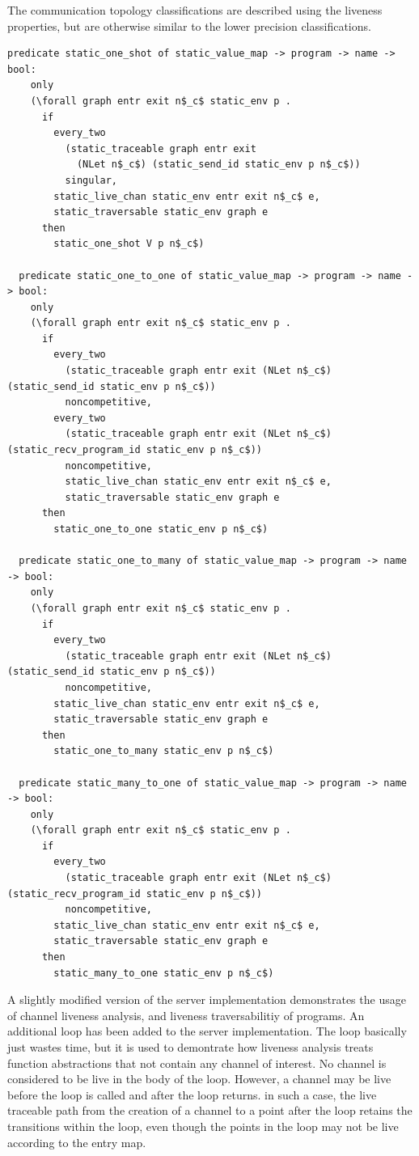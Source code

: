 \documentclass{article}
\begin{document}
The communication topology classifications are described using the liveness properties, but
are otherwise similar to the lower precision classifications.

\begin{lstlisting}[language=logic, mathescape]
  predicate static_one_shot of static_value_map -> program -> name -> bool:
    only
    (\forall graph entr exit n$_c$ static_env p . 
      if
        every_two
          (static_traceable graph entr exit
            (NLet n$_c$) (static_send_id static_env p n$_c$))
          singular, 
        static_live_chan static_env entr exit n$_c$ e, 
        static_traversable static_env graph e
      then
        static_one_shot V p n$_c$)

  predicate static_one_to_one of static_value_map -> program -> name -> bool:
    only
    (\forall graph entr exit n$_c$ static_env p .
      if
        every_two
          (static_traceable graph entr exit (NLet n$_c$) (static_send_id static_env p n$_c$))
          noncompetitive, 
        every_two
          (static_traceable graph entr exit (NLet n$_c$) (static_recv_program_id static_env p n$_c$))
          noncompetitive,
          static_live_chan static_env entr exit n$_c$ e,
          static_traversable static_env graph e
      then
        static_one_to_one static_env p n$_c$)

  predicate static_one_to_many of static_value_map -> program -> name -> bool:
    only
    (\forall graph entr exit n$_c$ static_env p .
      if
        every_two
          (static_traceable graph entr exit (NLet n$_c$) (static_send_id static_env p n$_c$))
          noncompetitive,
        static_live_chan static_env entr exit n$_c$ e,
        static_traversable static_env graph e
      then
        static_one_to_many static_env p n$_c$)

  predicate static_many_to_one of static_value_map -> program -> name -> bool:
    only
    (\forall graph entr exit n$_c$ static_env p .
      if
        every_two
          (static_traceable graph entr exit (NLet n$_c$) (static_recv_program_id static_env p n$_c$))
          noncompetitive, 
        static_live_chan static_env entr exit n$_c$ e,
        static_traversable static_env graph e
      then
        static_many_to_one static_env p n$_c$)
  \end{lstlisting}


A slightly modified version of the server implementation demonstrates the usage of channel liveness
analysis, and liveness traversabilitiy of programs.  An additional loop has been added to the
server implementation.  The loop basically just wastes time, but it is used to demontrate how
liveness analysis treats function abstractions that not contain
any channel of interest.  No channel is
considered to be live in the body of the loop.  However, a channel may be live before the loop is
called and after the loop returns.  in such a case, the live traceable path from the creation of a
channel to a point after the loop retains the transitions within the loop, even though the points in
the loop may not be live according to the entry map.
\end{document}
